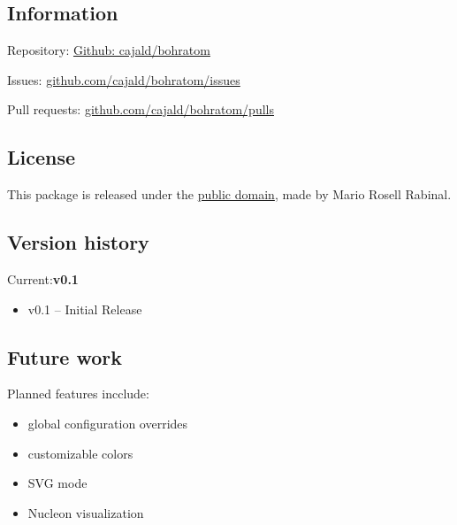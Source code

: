 \documentclass[
	a4paper,
	10pt,
]{article}
\begin{document}
\subsection{Information}

Repository: \quad\href{https://github.com/cajald/bohratom}{Github: cajald/bohratom}

\noindent Issues: \quad\href{https://github.com/cajald/bohratom/issues}{github.com/cajald/bohratom/issues}

\noindent Pull requests: \quad\href{https://github.com/cajald/bohratom/pulls}{github.com/cajald/bohratom/pulls}

\subsection{License}

This package is released under the \href{https://creativecommons.org/publicdomain/zero/1.0/legalcode.txt}{public domain}, made by Mario Rosell Rabinal.

\subsection{Version history}

Current:\quad{}\textbf{v0.1}

\begin{itemize}
	\item v0.1 -- Initial Release
\end{itemize}

\subsection{Future work}

Planned features incclude:

\begin{itemize}
	\item global configuration overrides
	\item customizable colors
	\item SVG mode
	\item Nucleon visualization
\end{itemize}
\end{document}
